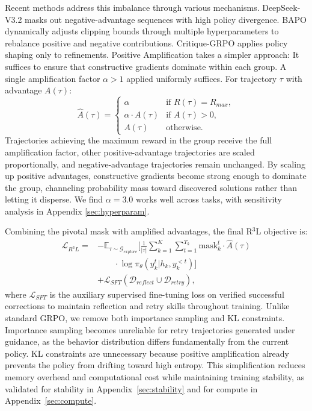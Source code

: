 \documentclass[11pt]{article}
\theoremstyle{definition}
\theoremstyle{remark}
\begin{document}
Recent methods address this imbalance through various mechanisms. DeepSeek-V3.2 \cite{liu2025deepseek32} masks out negative-advantage sequences with high policy divergence. BAPO \cite{xi2025bapo} dynamically adjusts clipping bounds through multiple hyperparameters to rebalance positive and negative contributions. Critique-GRPO \cite{zhang2025critique} applies policy shaping only to refinements. Positive Amplification takes a simpler approach: It suffices to ensure that constructive gradients dominate within each group. A single amplification factor $\alpha > 1$ applied uniformly suffices. For trajectory $\tau$ with advantage $A(\tau)$:
\begin{equation}
\label{eq:reweight_advantage}
    \hat{A}(\tau) = \begin{cases}
    \alpha & \text{if } R(\tau) = R_{max}, \\
    \alpha \cdot A(\tau) & \text{if } A(\tau) > 0, \\
    A(\tau) & \text{otherwise}.
    \end{cases}
\end{equation}
Trajectories achieving the maximum reward in the group receive the full amplification factor, other positive-advantage trajectories are scaled proportionally, and negative-advantage trajectories remain unchanged. By scaling up positive advantages, constructive gradients become strong enough to dominate the group, channeling probability mass toward discovered solutions rather than letting it disperse. We find $\alpha=3.0$ works well across tasks, with sensitivity analysis in Appendix \ref{sec:hyperparam}.

Combining the pivotal mask with amplified advantages, the final R$^3$L objective is:
\begin{equation}
\begin{split}
    \mathcal{L}_{R^3L} = & -\mathbb{E}_{\tau \sim \mathcal{G}_{explore}} \bigg[ \frac{1}{|\tau|} \sum_{k=1}^{K} \sum_{t=1}^{T_k} \text{mask}_k^t \cdot \hat{A}(\tau) \\
    & \qquad \cdot \log \pi_{\theta}(y_k^t | h_k, y_k^{<t}) \bigg] \\
    & + \mathcal{L}_{SFT}(\mathcal{D}_{reflect} \cup \mathcal{D}_{retry}),
\end{split}
\label{eq:R3L}
\end{equation}
where $\mathcal{L}_{SFT}$ is the auxiliary supervised fine-tuning loss on verified successful corrections to maintain reflection and retry skills throughout training. Unlike standard GRPO, we remove both importance sampling and KL constraints. Importance sampling becomes unreliable for retry trajectories generated under guidance, as the behavior distribution differs fundamentally from the current policy. KL constraints are unnecessary because positive amplification already prevents the policy from drifting toward high entropy. This simplification reduces memory overhead and computational cost while maintaining training stability, as validated for stability in Appendix~\ref{sec:stability} and for compute in Appendix~\ref{sec:compute}.
\end{document}
